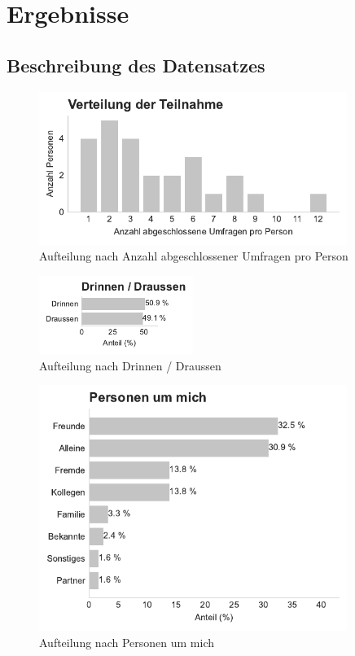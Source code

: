 
\section{Ergebnisse} \label{sec:ergebnisse}

\subsection{Beschreibung des Datensatzes}



\begin{figure}[htbp]
    \centering
    \includegraphics[width=10cm]{analysis/plots/survey_counts.pdf}
    \caption{Aufteilung nach Anzahl abgeschlossener Umfragen pro Person}
    \label{fig:survey_counts}
\end{figure}

\begin{figure}[htbp]
    \centering
    \includegraphics[width=5cm]{analysis/plots/cat_dist_indoors_outdoors.pdf}
    \caption{Aufteilung nach Drinnen / Draussen}
    \label{fig:cat_dist_indoors_outdoors}
\end{figure}

\begin{figure}[htbp]
    \centering
    \includegraphics[width=10cm]{analysis/plots/cat_dist_people_with_you.pdf}
    \caption{Aufteilung nach Personen um mich}
    \label{fig:cat_dist_people_with_you}
\end{figure}

